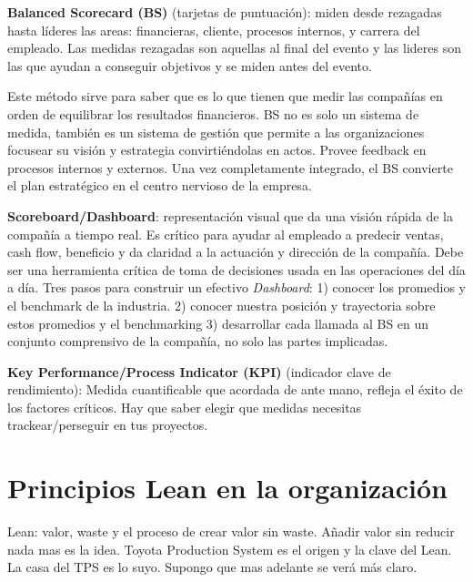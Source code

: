 \documentclass[]{article}
\begin{document}
\textbf{Balanced Scorecard (BS)} (tarjetas de puntuación): miden desde rezagadas hasta líderes las areas: financieras, cliente, procesos internos, y carrera del empleado. Las medidas rezagadas son aquellas al final del evento y las lideres son las que ayudan a conseguir objetivos y se miden antes del evento. 

Este método sirve para saber que es lo que tienen que medir las compañías en orden de equilibrar los resultados financieros. 
BS no es solo un sistema de medida, también es un sistema de gestión que permite a las organizaciones focusear su visión y estrategia convirtiéndolas en actos. Provee feedback en procesos internos y externos. Una vez completamente integrado, el BS convierte el plan estratégico en el centro nervioso de la empresa.

\textbf{Scoreboard/Dashboard}: representación visual que da una visión rápida de la compañía a tiempo real. Es crítico para ayudar al empleado a predecir ventas, cash flow, beneficio y da claridad a la actuación y dirección de la compañía. Debe ser una herramienta crítica de toma de decisiones usada en las operaciones del día a día. Tres pasos para construir un efectivo \textit{Dashboard}: 1) conocer los promedios y el benchmark de la industria. 2) conocer nuestra posición y trayectoria sobre estos promedios y el benchmarking 3) desarrollar cada llamada al BS en un conjunto comprensivo de la compañía, no solo las partes implicadas.

\textbf{Key Performance/Process Indicator (KPI)} (indicador clave de rendimiento): Medida cuantificable que acordada de ante mano, refleja el éxito de los factores críticos. Hay que saber elegir que medidas necesitas trackear/perseguir en tus proyectos. 

\section{Principios Lean en la organización}

Lean: valor, waste y el proceso de crear valor sin waste. Añadir valor sin reducir nada mas es la idea. Toyota Production System es el origen y la clave del Lean. La casa del TPS es lo suyo. Supongo que mas adelante se verá más claro.
\end{document}
